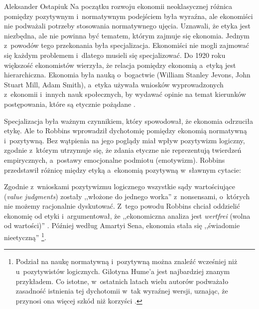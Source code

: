 \begin{artplenv}{Aleksander Ostapiuk}
Na początku rozwoju ekonomii neoklasycznej różnica pomiędzy pozytywnym i~normatywnym podejściem była wyraźna, ale ekonomiści nie
podważali potrzeby stosowania normatywnego ujęcia. Uznawali, że etyka jest niezbędna, ale nie powinna być tematem,
którym zajmuje się ekonomia. Jednym z~powodów tego przekonania była specjalizacja. Ekonomiści nie mogli zajmować się
każdym problemem i~dlatego musieli się specjalizować. Do 1920 roku większość ekonomistów wierzyła, że relacja pomiędzy
ekonomią a~etyką jest hierarchiczna. Ekonomia była nauką o~bogactwie (William Stanley Jevons,
John Stuart Mill, Adam Smith), a~etyka używała wniosków wyprowadzonych
z~ekonomii i~innych nauk społecznych, by wydawać opinie na temat kierunków postępowania, które są etycznie pożądane
\parencite{yuengert_positive-normative_2000}.

Specjalizacja była ważnym czynnikiem, który spowodował, że ekonomia odrzuciła etykę. Ale to Robbins wprowadził dychotomię
pomiędzy ekonomią normatywną i~pozytywną. Bez wątpienia na jego poglądy miał wpływ pozytywizm logiczny, zgodnie z~którym
utrzymuje się, że zdania etyczne nie reprezentują twierdzeń empirycznych, a~postawy emocjonalne podmiotu (emotywizm). Robbins
przedstawił różnicę między etyką a~ekonomią pozytywną w~sławnym cytacie:


Zgodnie z~wnioskami pozytywizmu logicznego wszystkie sądy wartościujące (\textit{value judgments}) zostały ,,włożone do
jednego worka'' z~nonsensami, o~których nie możemy racjonalnie dyskutować. Z~tego powodu Robbins chciał oddzielić
ekonomię od etyki i~argumentował, że ,,ekonomiczna analiza jest \textit{wertfrei }(wolna od wartości)''
\parencite[s.~91]{robbins_essay_1935}.
Później według Amartyi Sena, ekonomia stała się ,,świadomie nieetyczną''
\parencite[s.~2]{sen_ethics_1987}\footnote{Podział na naukę normatywną i~pozytywną można znaleźć wcześniej niż
u~pozytywistów logicznych. Gilotyna Hume'a jest najbardziej znanym przykładem. Co istotne, w~ostatnich latach wielu
autorów podważało zasadność istnienia tej dychotomii w~tak wyraźnej wersji, uznając, że przynosi ona więcej szkód niż
korzyści
\parencite{blaug_metodologia_1995,putnam_collapse_2002,mongin_value_2006,czarny_pozytywizm_2010}.
}. 


\end{artplenv}
